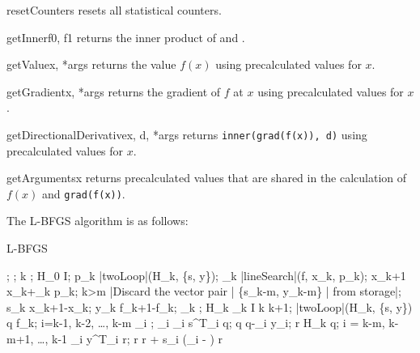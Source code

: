 \begin{methoddesc}[CostFunction]{resetCounters}{}
    resets all statistical counters.
\end{methoddesc}
%
\begin{methoddesc}[CostFunction]{getInner}{f0, f1}
    returns the inner product of  and .
\end{methoddesc}
%
\begin{methoddesc}[CostFunction]{getValue}{x, *args}
    returns the value $f(x)$ using precalculated values for $x$.
\end{methoddesc}
%
\begin{methoddesc}[CostFunction]{getGradient}{x, *args}
    returns the gradient of $f$ at $x$ using precalculated values for $x$.
\end{methoddesc}
%
\begin{methoddesc}[CostFunction]{getDirectionalDerivative}{x, d, *args}
    returns \texttt{inner(grad(f(x)), d)} using precalculated values for $x$.
\end{methoddesc}
%
\begin{methoddesc}[CostFunction]{getArguments}{x}
    returns precalculated values that are shared in the calculation of $f(x)$
    and \texttt{grad(f(x))}.
\end{methoddesc}

The L-BFGS algorithm is as follows:

\begin{algorithm}
    \mbox{L-BFGS}
    \begin{program}
        \BEGIN
        ;
        ;
        k ;
        H_0 \leftarrow I;
        \WHILE \NOT{} \DO
        p_k \leftarrow |twoLoop|(H_k, \{s, y\});
        \alpha_k \leftarrow |lineSearch|(f, x_k, p_k); 
        x_{k+1} \leftarrow x_k+\alpha_k p_k;
        \IF k>m
        \THEN
            |Discard the vector pair | \{s_{k-m}, y_{k-m}\} | from storage|;
        \FI
        s_k \leftarrow x_{k+1}-x_k;
        y_k \leftarrow \nabla f_{k+1}-\nabla f_k;
        \gamma_k \leftarrow {};
        H_k \leftarrow \gamma_k I
        k \leftarrow k+1;
        \OD
        \WHERE
        \FUNCT |twoLoop|(H_k, \{s, y\}) \BODY
            \EXP q \leftarrow \nabla f_k;
            \FOR i=k-1, k-2, \ldots, k-m \DO
            \rho_i \leftarrow {};
            \alpha_i \leftarrow \rho_i s^T_i q;
            q \leftarrow q-\alpha_i y_i;
            \OD
            r \leftarrow H_k q;
            \FOR i = k-m, k-m+1, \ldots, k-1 \DO
            \beta \leftarrow \rho_i y^T_i r;
            r \leftarrow r + s_i (\alpha_i - \beta)
            \OD
            r \ENDEXP \ENDFUNCT
        \END
    \end{program}
\end{algorithm}

